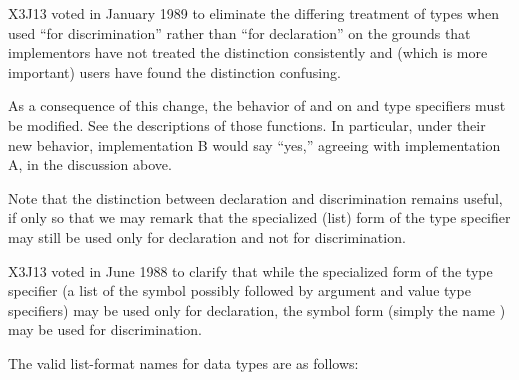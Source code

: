 \begin{new}
X3J13 voted in January 1989
to eliminate the differing treatment of types
when used ``for discrimination'' rather than ``for declaration'' on the grounds
that implementors have not treated the distinction consistently
and (which is more important) users have found the distinction confusing.

As a consequence of this change, the behavior of  and 
on  and  type specifiers must be modified.
See the descriptions of those functions.  In particular, under their new
behavior, implementation B would say ``yes,'' agreeing with implementation A,
in the discussion above.

Note that the distinction between declaration and discrimination remains
useful, if only so that we may remark that the specialized (list)
form of the
 type specifier may still be used only for declaration and
not for discrimination.
\end{new}

\begin{new}
X3J13 voted in June 1988  to clarify that
while the specialized form of the  type specifier
(a list of the symbol  possibly followed by
argument and value type specifiers)
may be used only for declaration, the symbol form (simply the name
) may be used for discrimination.
\end{new}

The valid list-format names for data types are as follows:

